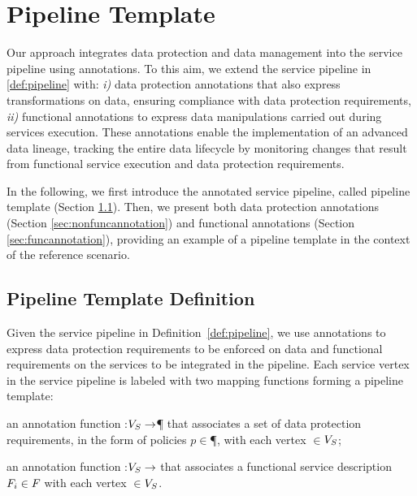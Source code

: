 \section{Pipeline Template}\label{sec:template}
Our approach integrates data protection and data management into the service pipeline using annotations.
To this aim, we extend the service pipeline in \cref{def:pipeline} with: \emph{i)} data protection annotations that also express transformations on data, ensuring compliance with data protection requirements, \emph{ii)} functional annotations to express data manipulations carried out during services execution.
These annotations enable the implementation of an advanced data lineage, tracking the entire data lifecycle by monitoring changes that result from functional service execution and data protection requirements.

In the following, we first introduce the annotated service pipeline, called pipeline template (Section \ref{sec:templatedefinition}). Then, we present both data protection annotations (Section \ref{sec:nonfuncannotation}) and functional annotations (Section \ref{sec:funcannotation}), providing an example of a pipeline template in the context of the reference scenario.


\subsection{Pipeline Template Definition}\label{sec:templatedefinition}
Given the service pipeline in Definition~\ref{def:pipeline}, we use annotations to express data protection requirements to be enforced on data and functional requirements on the services to be integrated in the pipeline. Each service vertex in the service pipeline is labeled with two mapping functions forming a pipeline template:
\begin{enumerate*}[label=\textit{\roman*})]
  \item an annotation function \myLambda:$V_S\rightarrow$\P{} that associates a set of data protection requirements, in the form of policies $p$$\in$\P{}, with each vertex $\in$$V_S$;
  \item an annotation function \myGamma:$V_S\rightarrow$\F{} that associates a functional service description $F_i\in F_{}$ with each vertex $\in$$V_S$.
\end{enumerate*}

